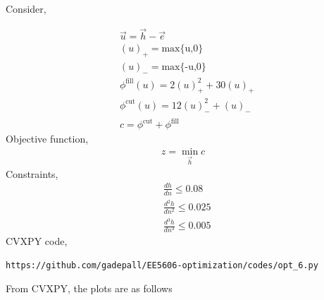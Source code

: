 \documentclass[journal,12pt,twocolumn]{IEEEtran}
\begin{document}
\begin{enumerate}
\solution\\
Consider,
\begin{table}[H]
 \centering
 \caption{}
 \end{table}
 \begin{align}
& \vec{u} = \vec{h} -\vec{e} \nonumber\\
& (u)_+ = \text{max\{u,0\}} \nonumber\\
& (u)_- = \text{max\{-u,0\}} \nonumber\\
& \phi^\text{fill}(u) = 2(u)_+^2 + 30(u)_+ \nonumber\\
& \phi^\text{cut}(u) = 12(u)_-^2 + (u)_- \nonumber\\
&c= \phi^\text{cut}+\phi^\text{fill} \nonumber
\end{align}
 Objective function,
 \begin{align}
 z=\min_{\vec{h}} c
 \end{align}
 Constraints,
 \begin{align}
 & \displaystyle\frac{dh}{dn} \leq 0.08\\
 & \displaystyle\frac{d^2h}{dn^2} \leq 0.025\\
 & \displaystyle\frac{d^3h}{dn^3} \leq 0.005
 \end{align}
 CVXPY code,
 \begin{lstlisting}
https://github.com/gadepall/EE5606-optimization/codes/opt_6.py
\end{lstlisting}
 From CVXPY, the plots are as follows
 \begin{figure}[H]
	\centering

\end{figure}
\end{enumerate}
\end{document}
